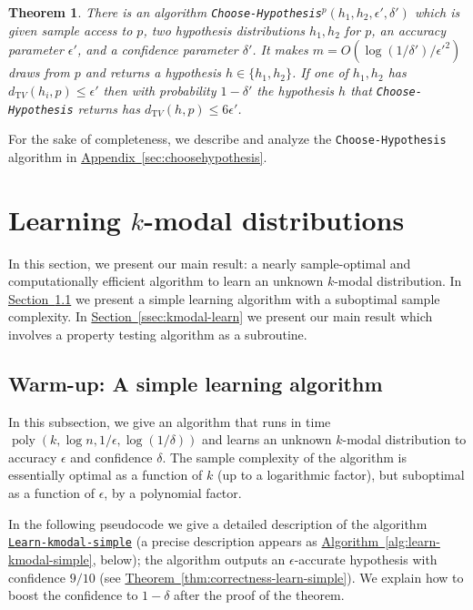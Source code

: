 \documentclass[10pt]{article}
\newtheorem{theorem}{Theorem}[section]
\theoremstyle{definition}
\numberwithin{equation}{section}
\newcommand{\expref}[2]{\texorpdfstring{\hyperref[#2]{#1~\ref{#2}}}{#1~\ref{#2}}}
\newcommand{\algorithml}[1]{{\normalfont\texttt{#1}}}
\newcommand{\dtv}{d_{\mathrm TV}}
\newcommand{\eps}{\epsilon}
\newcommand{\poly}{\operatorname{poly}}
\begin{document}
%

\begin{theorem} \label{thm:choosehypothesis}
There is an algorithm \algorithml{Choose-Hypothesis}$^p({h}_1,{h}_2,\eps',\delta')$ which is given
{sample} access to $p$, two hypothesis distributions $h_1,h_2$ for $p$,  an accuracy parameter
$\eps'$, and a confidence parameter $\delta'$.  It makes $m=O(\log(1/\delta')/\eps'^2)$ draws
from $p$ and returns a hypothesis $h \in \{h_1,h_2\}$.  If one of $h_1,h_2$ has
$\dtv(h_i,p) \leq \eps'$ then with probability $1-\delta'$ the hypothesis $h$ that
\algorithml{Choose-Hypothesis} returns has $\dtv(h,p) \leq 6 \eps'$.
\end{theorem}

%


\noindent For the sake of completeness, we describe and analyze the \algorithml{Choose-Hypothesis} algorithm
in \expref{Appendix}{sec:choosehypothesis}.

%

%

\section{Learning \texorpdfstring{$k$-modal}{k-modal} distributions} \label{sec:learning}

%


In this section, we present our main result: a nearly sample-optimal
and computationally efficient algorithm to learn an unknown $k$-modal
distribution.
In \expref{Section}{ssec:kmodal-learn-simple} we present a simple learning
algorithm with a suboptimal sample complexity.
In \expref{Section}{ssec:kmodal-learn} we present our main result which involves
a property testing algorithm as a subroutine.

\subsection{Warm-up: A simple learning algorithm} \label{ssec:kmodal-learn-simple}

In this subsection, we give an algorithm that runs in time $\poly(k, \log n, 1/\eps, \log(1/\delta))$
and learns an unknown $k$-modal distribution to accuracy $\eps$ and confidence $\delta$.
The sample complexity of the algorithm is {essentially optimal as a function of $k$ (up to a logarithmic factor), but}
suboptimal as a function of $\eps$, by a polynomial factor.

In the following {pseudocode} we give a detailed description of the
algorithm \hyperref[alg:learn-kmodal-simple]{\algorithml{Learn-kmodal-simple}}
%
(a precise description appears as
\expref{Algorithm}{alg:learn-kmodal-simple}, below);
%
{the algorithm outputs} an $\eps$-accurate hypothesis with confidence $9/10$ (see \expref{Theorem}{thm:correctness-learn-simple}). 
We explain how to boost the confidence to $1-\delta$ after the proof of the theorem.
\end{document}
